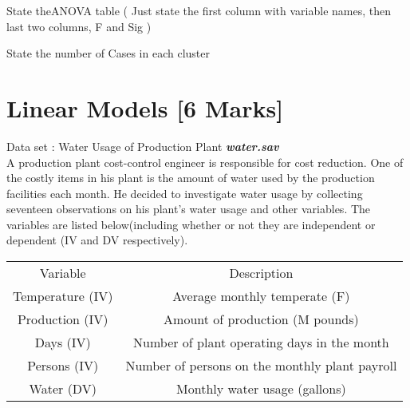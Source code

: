 \documentclass[12pt, a4paper]{article}
\theoremstyle{plain}
\theoremstyle{definition}
\theoremstyle{remark}
\begin{document}
State theANOVA table ( Just state the first column with variable names, then last two columns, F and Sig )

State the number of Cases in each cluster
\newpage
\section{Linear Models [6 Marks] }  %

Data set : Water Usage of Production Plant \textit{\textbf{water.sav}}\\

A production plant cost-control engineer is responsible for cost reduction. One of the costly items in his plant is the amount of water used by the production facilities each month. He decided to investigate water usage by collecting seventeen observations on his plant's water usage and other variables. The variables are listed below(including whether or not they are independent or dependent (IV and DV respectively).
\begin{center}
\begin{tabular}{|c|c|}
  \hline
Variable	&	Description \\
Temperature (IV)	&	Average monthly temperate (F)\\
Production (IV)	&	Amount of production (M pounds)\\
Days	(IV) &	Number of plant operating days in the month\\
Persons	(IV) &	Number of persons on the monthly plant payroll\\
Water (DV)	&	Monthly water usage (gallons)\\
  \hline
\end{tabular}
\end{center}
\newpage
\end{document}
